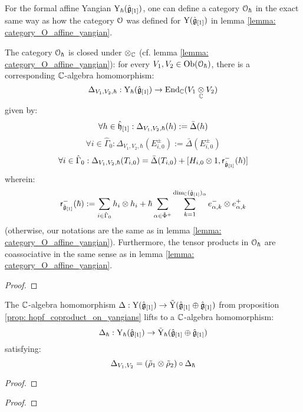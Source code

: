         \begin{lemma} \label{lemma: category_O_formal_affine_yangian}
            For the formal affine Yangian $\mathrm{Y}_{\hbar}(\hat{\mathfrak{g}}_{[1]})$, one can define a category $\mathcal{O}_{\hbar}$ in the exact same way as how the category $\mathcal{O}$ was defined for $\mathrm{Y}(\hat{\mathfrak{g}}_{[1]})$ in lemma \ref{lemma: category_O_affine_yangian}. 

            The category $\mathcal{O}_{\hbar}$ is closed under $\tensor_{\bbC}$ (cf. lemma \ref{lemma: category_O_affine_yangian}): for every $V_1, V_2 \in \mathrm{Ob}(\mathcal{O}_{\hbar})$, there is a corresponding $\mathbb{C}$-algebra homomorphism:
                $$\Delta_{V_1, V_2, \hbar}: \rmY_{\hbar}(\hat{\g}_{[1]}) \to \End_{\bbC}(V_1 \tensor_{\bbC} V_2)$$
            given by:
                $$\forall h \in \hat{\mathfrak{h}}_{[1]}: \Delta_{V_1, V_2, \hbar}(h) := \bar{\Delta}(h)$$
                $$\forall i \in \hat{\Gamma}_0: \Delta_{V_1, V_2, \hbar}(E_{i, 0}^{\pm}) := \bar{\Delta}(E_{i, 0}^{\pm})$$
                $$\forall i \in \hat{\Gamma}_0: \Delta_{V_1, V_2, \hbar}(T_{i, 0}) = \bar{\Delta}(T_{i, 0}) + [H_{i, 0} \tensor 1, \sfr_{ \hat{\g}_{[1]} }^-(\hbar)]$$
            wherein:
                $$\sfr_{ \hat{\g}_{[1]} }^-(\hbar) := \sum_{i \in \hat{\Gamma}_0} h_i \tensor h_i + \hbar \sum_{\alpha \in \hat{\Phi}^+} \sum_{k = 1}^{ \dim_{\bbC} (\hat{\g}_{[1]})_{\alpha} } e_{\alpha, k}^- \tensor e_{\alpha, k}^+$$
            (otherwise, our notations are the same as in lemma \ref{lemma: category_O_affine_yangian}). Furthermore, the tensor products in $\mathcal{O}_{\hbar}$ are coassociative in the same sense as in lemma \ref{lemma: category_O_affine_yangian}.
        \end{lemma}
            \begin{proof}
                
            \end{proof}
        \begin{theorem} \label{theorem: hopf_coproduct_on_formal_yangians}
            The $\mathbb{C}$-algebra homomorphism $\Delta: \mathrm{Y}(\hat{\mathfrak{g}}_{[1]}) \to \tilde{\mathrm{Y}}(\hat{\mathfrak{g}}_{[1]} \oplus \hat{\mathfrak{g}}_{[1]})$ from proposition \ref{prop: hopf_coproduct_on_yangians} lifts to a $\mathbb{C}$-algebra homomorphism:
                $$\Delta_{\hbar}: \mathrm{Y}_{\hbar}(\hat{\mathfrak{g}}_{[1]}) \to \tilde{\mathrm{Y}}_{\hbar}(\hat{\mathfrak{g}}_{[1]} \oplus \hat{\mathfrak{g}}_{[1]})$$
            satisfying:
                $$\Delta_{V_1, V_2} = (\tilde{\rho}_1 \tensor \tilde{\rho}_2) \circ \Delta_{\hbar}$$
        \end{theorem}
            \begin{proof}
                
            \end{proof}
        
        \begin{theorem} \label{theorem: toroidal_lie_algebras_as_classical_limits_of_formal_affine_yangians}
           
        \end{theorem}
            \begin{proof}
                
            \end{proof}